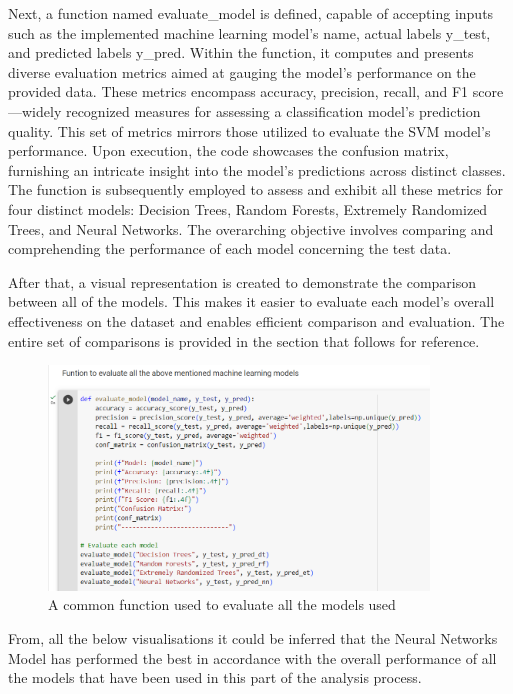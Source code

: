 \documentclass[12pt]{article}
\begin{document}
Next, a function named evaluate\_model is defined, capable of accepting inputs such as the implemented machine learning model's name, actual labels y\_test, and predicted labels y\_pred. Within the function, it computes and presents diverse evaluation metrics aimed at gauging the model's performance on the provided data. These metrics encompass accuracy, precision, recall, and F1 score—widely recognized measures for assessing a classification model's prediction quality. This set of metrics mirrors those utilized to evaluate the SVM model's performance. Upon execution, the code showcases the confusion matrix, furnishing an intricate insight into the model's predictions across distinct classes. The function is subsequently employed to assess and exhibit all these metrics for four distinct models: Decision Trees, Random Forests, Extremely Randomized Trees, and Neural Networks. The overarching objective involves comparing and comprehending the performance of each model concerning the test data.

After that, a visual representation is created to demonstrate the comparison between all of the models. This makes it easier to evaluate each model's overall effectiveness on the dataset and enables efficient comparison and evaluation. The entire set of comparisons is provided in the section that follows for reference.


\begin{figure}[ht]
    \centering
    \includegraphics[width = 0.9\textwidth]{Figures/Evaluate_model.png}
    \caption{A common function used to evaluate all the models used}
    \label{fig:A common function used to evaluate all the models used}
\end{figure}

From, all the below visualisations it could be inferred that the Neural Networks Model has performed the best in accordance with the overall performance of all the models that have been used in this part of the analysis process.
\end{document}
